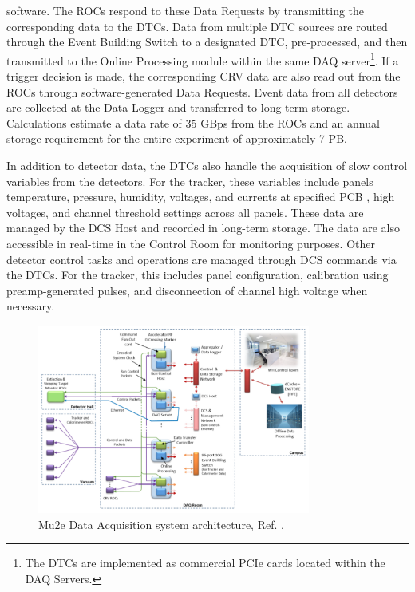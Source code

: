 software. The ROCs respond to these Data Requests by transmitting the 
corresponding data to the DTCs. Data from multiple DTC sources are routed 
through the Event Building Switch to a designated DTC, pre-processed, and 
then transmitted to the Online Processing module within the same DAQ 
server\footnote{The DTCs are implemented as commercial PCIe cards located 
within the DAQ Servers.}. If a trigger decision is made, the corresponding 
CRV data are also read out from the ROCs through software-generated Data 
Requests. Event data from all detectors are collected at the Data Logger 
and  transferred to  long-term storage. Calculations estimate a data rate of 35 GBps 
%
from the ROCs and an annual storage requirement for the entire experiment of 
approximately 7 PB. 

In addition to  detector data, the DTCs also handle the acquisition of 
slow control variables from the detectors. For the tracker, these variables 
include panels temperature, pressure, humidity, voltages, and currents at 
specified PCB , high voltages, and channel threshold settings across 
all panels. These data are managed by the DCS Host and recorded in long-term 
storage. The data are also accessible in real-time in the Control Room for 
monitoring purposes. Other detector control tasks and operations are managed 
through DCS commands via the DTCs. For the tracker, this includes panel 
configuration, calibration using preamp-generated pulses, and disconnection 
of channel high voltage when necessary. 

\begin{figure}[!h]
    \centering
    \includegraphics[width =0.8\textwidth]{figures/png/Screenshot_20240206_144803.png}
    \caption[The Mu2e Data Acquisition system architecture.]{Mu2e Data Acquisition system architecture, Ref. \cite{GIOIOSA2023167732}.}
    \label{fig:linktodaq}
    \end{figure}



